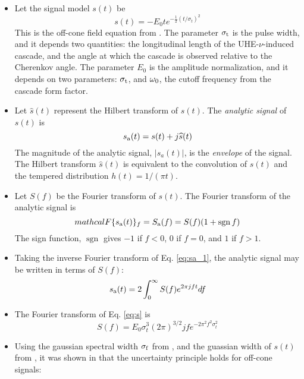 \documentclass[amsmath,amssymb,aps,prd,10pt,twocolumn,showkeys]{revtex4}
\DeclareMathOperator{\sgn}{sgn}
\begin{document}
\begin{itemize}
\item Let the signal model $s(t)$ be
\begin{equation}
s(t) = -E_0 t e^{-\frac{1}{2}\left(t/\sigma_t\right)^2} \label{eq:s}
\end{equation}
This is the off-cone field equation from \cite{PhysRevD.105.123019}.  The parameter $\sigma_{\rm t}$ is the pulse width, and it depends two quantities: the longitudinal length of the UHE-$\nu$-induced cascade, and the angle at which the cascade is observed relative to the Cherenkov angle.  The parameter $E_0$ is the amplitude normalization, and it depends on two parameters: $\sigma_{\rm t}$, and $\omega_{\rm 0}$, the cutoff frequency from the cascade form factor.
\item Let $\widehat{s}(t)$ represent the Hilbert transform of $s(t)$.  The \textit{analytic signal} of $s(t)$ is
\begin{equation}
s_{\rm a}(t) = s(t) + j \widehat{s}(t)
\end{equation}
The magnitude of the analytic signal, $|s_a(t)|$, is the \textit{envelope} of the signal.  The Hilbert transform $\widehat{s}(t)$ is equivalent to the convolution of $s(t)$ and the tempered distribution $h(t) = 1/(\pi t)$.
\item Let $S(f)$ be the Fourier transform of $s(t)$.  The Fourier transform of the analytic signal is
\begin{equation}
mathcal{F}\lbrace s_{\rm a}(t) \rbrace_{f} = S_{\rm a}(f) = S(f)(1+\sgn{f}) \label{eq:sa_1}
\end{equation}
The sign function, $\sgn$ gives $-1$ if $f<0$, $0$ if $f=0$, and $1$ if $f>1$.
\item Taking the inverse Fourier transform of Eq. \ref{eq:sa_1}, the analytic signal may be written in terms of $S(f)$:
\begin{equation}
s_{\rm a}(t) = 2\int_{0}^{\infty} S(f) e^{2\pi j f t} df \label{eq:sa_2}
\end{equation}
\item The Fourier transform of Eq. \ref{eq:s} is
\begin{equation}
S(f) = E_0 \sigma_t^3 (2\pi)^{3/2} j f e^{-2\pi^2 f^2 \sigma_t^2}
\end{equation}
\item Using the gaussian spectral width $\sigma_{\rm f}$ from \cite{10.1016/j.astropartphys.2017.03.008}, and the guassian width of $s(t)$ from \cite{PhysRevD.105.123019}, it was shown in \cite{PhysRevD.105.123019} that the uncertainty principle holds for off-cone signals:

\end{itemize}
\end{document}
